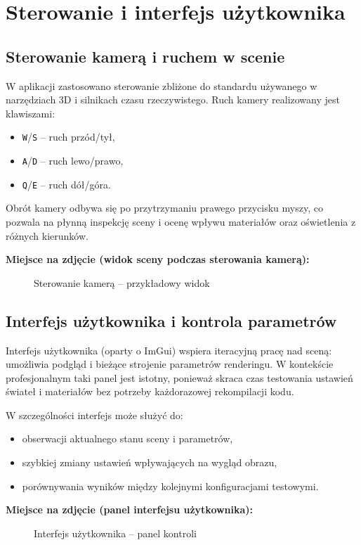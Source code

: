 \documentclass[12pt,a4paper]{article}
\begin{document}
\section{Sterowanie i interfejs użytkownika}
\subsection{Sterowanie kamerą i ruchem w scenie}
W aplikacji zastosowano sterowanie zbliżone do standardu używanego w narzędziach 3D i silnikach czasu rzeczywistego. Ruch kamery realizowany jest klawiszami:
\begin{itemize}
  \item \texttt{W}/\texttt{S} -- ruch przód/tył,
  \item \texttt{A}/\texttt{D} -- ruch lewo/prawo,
  \item \texttt{Q}/\texttt{E} -- ruch dół/góra.
\end{itemize}
Obrót kamery odbywa się po przytrzymaniu prawego przycisku myszy, co pozwala na płynną inspekcję sceny i ocenę wpływu materiałów oraz oświetlenia z różnych kierunków.

\textbf{Miejsce na zdjęcie (widok sceny podczas sterowania kamerą):}
\begin{figure}[H]
\centering
\fbox{\rule{0pt}{6cm}\rule{0.9\linewidth}{0pt}}
\caption{Sterowanie kamerą -- przykładowy widok}
\end{figure}

\subsection{Interfejs użytkownika i kontrola parametrów}
Interfejs użytkownika (oparty o ImGui) wspiera iteracyjną pracę nad sceną: umożliwia podgląd i bieżące strojenie parametrów renderingu. W kontekście profesjonalnym taki panel jest istotny, ponieważ skraca czas testowania ustawień świateł i materiałów bez potrzeby każdorazowej rekompilacji kodu.

W szczególności interfejs może służyć do:
\begin{itemize}
  \item obserwacji aktualnego stanu sceny i parametrów,
  \item szybkiej zmiany ustawień wpływających na wygląd obrazu,
  \item porównywania wyników między kolejnymi konfiguracjami testowymi.
\end{itemize}

\textbf{Miejsce na zdjęcie (panel interfejsu użytkownika):}
\begin{figure}[H]
\centering
\fbox{\rule{0pt}{6cm}\rule{0.9\linewidth}{0pt}}
\caption{Interfejs użytkownika -- panel kontroli}
\end{figure}
\end{document}

